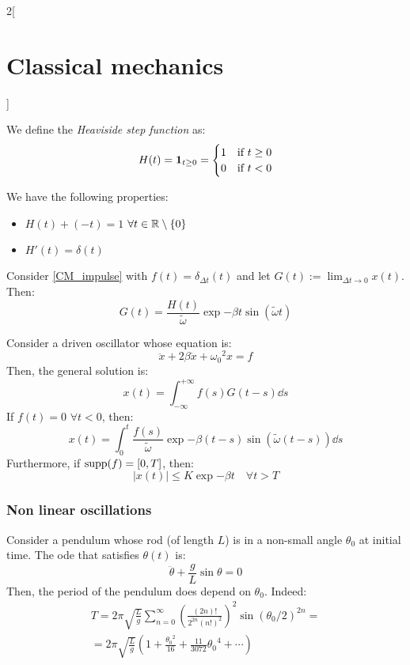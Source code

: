 \documentclass[../../../main_physics.tex]{subfiles}
\begin{document}
\begin{multicols}{2}[\section{Classical mechanics}]
\begin{proposition}
  \end{proposition}
  \begin{definition}
    We define the \emph{Heaviside step function} as: $$H(t)=\boldsymbol{\mathrm{1}}_{t\geq 0}=
      \begin{cases}
        1 & \text{if }t\geq 0 \\
        0 & \text{if }t<0
      \end{cases}
    $$
  \end{definition}
  \begin{proposition}
    We have the following properties:
    \begin{itemize}
      \item $H(t)+(-t)=1$ $\forall t\in\mathbb{R}\setminus\{0\}$
      \item $H'(t)=\delta(t)$
    \end{itemize}
  \end{proposition}
  \begin{proposition}
    Consider \cref{CM_impulse} with $f(t)=\delta_{\Delta t}(t)$ and let $\displaystyle G(t):=\lim_{\Delta t\to 0}x(t)$. Then: $$G(t)=\frac{H(t)}{\tilde{\omega}}\exp{-\beta t}\sin(\tilde{\omega}t)$$
  \end{proposition}
  \begin{theorem}
    Consider a driven oscillator whose equation is:
    \begin{equation*}
      \ddot{x}+2\beta\dot{x}+{\omega_0}^2x=f
    \end{equation*}
    Then, the general solution is: $$x(t)=\int_{-\infty}^{+\infty}f(s)G(t-s)\dd{s}$$
    If $f(t)=0$ $\forall t<0$, then:
    $$x(t)=\int_0^t\frac{f(s)}{\tilde{\omega}}\exp{-\beta (t-s)}\sin(\tilde{\omega}(t-s))\dd{s}$$
    Furthermore, if $\operatorname{supp} (f)=[0,T]$, then: $$|x(t)|\leq K\exp{-\beta t}\quad\forall t> T$$
  \end{theorem}
  \subsubsection{Non linear oscillations}
  \begin{definition}
    Consider a pendulum whose rod (of length $L$) is in a non-small angle $\theta_0$ at initial time. The ode that satisfies $\theta(t)$ is:
    $$\ddot{\theta}+\frac{g}{L}\sin\theta=0$$
    Then, the period of the pendulum does depend on $\theta_0$. Indeed:
    \begin{multline*}
      T=2\pi\sqrt{\frac{L}{g}}\sum_{n=0}^\infty{\left(\frac{(2n)!}{2^{2n}{(n!)}^2}\right)}^2{\sin(\theta_0/2)}^{2n}=\\=2\pi\sqrt{\frac{L}{g}}\left(1+\frac{{\theta_0}^2}{16}+\frac{11}{3072}{\theta_0}^4+\cdots\right)
    \end{multline*}
  \end{definition}

\end{multicols}
\end{document}
